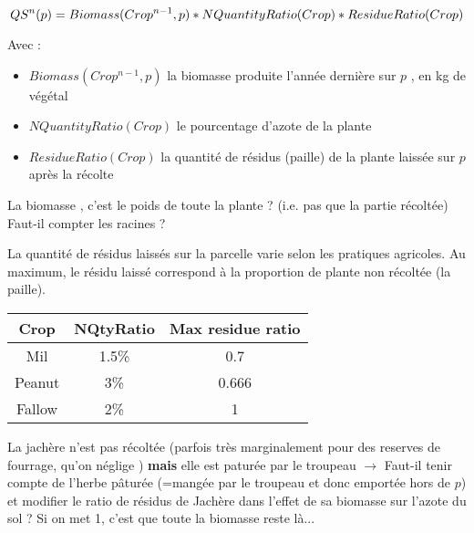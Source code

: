 \documentclass[10pt,a4paper,french]{article} %
\begin{document}
\begin{equation}
QS^{n}(p) = Biomass(Crop^{n-1},p) * NQuantityRatio(Crop) * ResidueRatio(Crop) \\
\end{equation}

Avec  :

\begin{itemize}
	\item $Biomass(Crop^{n-1},p)$  la biomasse produite l'année dernière sur $p$ , en kg de végétal
	\item $NQuantityRatio(Crop)$ le pourcentage d'azote de la plante 
	\item $ResidueRatio(Crop)$  la quantité de résidus (paille) de la plante laissée sur  $p$ après la récolte
\end{itemize}



\begin{tcolorbox}[noparskip,
    colback=LightGreen,colframe=DarkGreen,%
    colbacklower=LimeGreen!75!LightGreen,%
    title=Question]
La biomasse , c'est le poids de toute la plante ? (i.e. pas que la partie  récoltée)
Faut-il compter les racines ? 
\end{tcolorbox}






La quantité de résidus laissés sur la parcelle varie selon les pratiques agricoles.
Au maximum, le résidu laissé correspond à la proportion de plante non récoltée (la paille).



\begin{table}[h!]
\begin{tabular}{|c|c|c|}
\hline
\textbf{Crop}          & \textbf{NQtyRatio}    & \textbf{Max residue ratio} \\ \hline
Mil                    & 1.5\%                 & 0.7                        \\ \hline
Peanut                 & 3\%                   & 0.666                      \\ \hline
Fallow                 & 2\%                   & 1                          \\ \hline
\end{tabular}
\end{table}



\begin{tcolorbox}[noparskip,
    colback=LightGreen,colframe=DarkGreen,%
    colbacklower=LimeGreen!75!LightGreen,%
    title=Question]

La jachère n'est pas récoltée (parfois très marginalement pour des reserves de fourrage, qu'on néglige ) \textbf{mais} elle est paturée par le troupeau $\rightarrow$ Faut-il  tenir compte de l'herbe pâturée (=mangée par le troupeau et donc emportée hors de $p$) et modifier le ratio de résidus de Jachère dans l'effet de sa biomasse sur l'azote du sol ?  Si on met 1, c'est que toute la biomasse reste là...
\end{tcolorbox}
\end{document}
